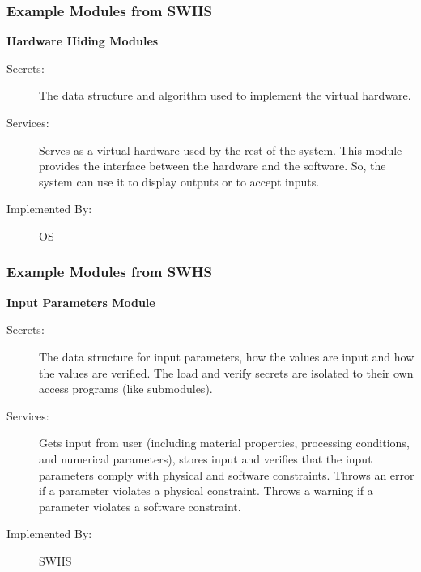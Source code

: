 \documentclass[t, 12pt, numbers, fleqn, handout]{beamer}
\begin{document}

\begin{frame}
\frametitle{Example Modules from SWHS}

\textbf{Hardware Hiding Modules}

\begin{description}
\item[Secrets:] The data structure and algorithm used to implement the virtual
  hardware.
\item[Services:] Serves as a virtual hardware used by the rest of the
  system. This module provides the interface between the hardware and the
  software. So, the system can use it to display outputs or to accept inputs.
\item[Implemented By:] OS
\end{description}

\end{frame}


\begin{frame}
\frametitle{Example Modules from SWHS}

\textbf{Input Parameters Module}

\begin{description}
\item[Secrets:] The data structure for input parameters, how the
values are input and how the values are verified.  The load and verify secrets
are isolated to their own access programs (like submodules). %
\item[Services:] Gets input from user (including material properties, processing
  conditions, and numerical parameters), stores input and verifies that the
  input parameters comply with physical and software constraints. Throws an
  error if a parameter violates a physical constraint. Throws a warning if a
  parameter violates a software constraint.  %
\item[Implemented By:] SWHS
\end{description}

\end{frame}

\end{document}
